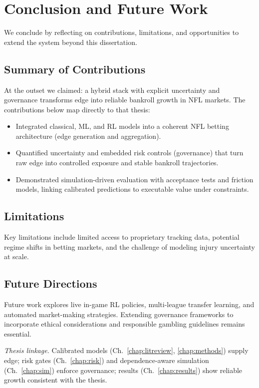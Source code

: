 \chapter{Conclusion and Future Work}
\label{chap:conclusion}

We conclude by reflecting on contributions, limitations, and opportunities to extend the system beyond this dissertation.

\section{Summary of Contributions}
At the outset we claimed: a hybrid stack with explicit uncertainty and governance transforms edge into reliable bankroll growth in NFL markets. The contributions below map directly to that thesis:
\begin{itemize}
  \item Integrated classical, ML, and RL models into a coherent NFL betting architecture (edge generation and aggregation).
  \item Quantified uncertainty and embedded risk controls (governance) that turn raw edge into controlled exposure and stable bankroll trajectories.
  \item Demonstrated simulation-driven evaluation with acceptance tests and friction models, linking calibrated predictions to executable value under constraints.
\end{itemize}

\section{Limitations}
Key limitations include limited access to proprietary tracking data, potential regime shifts in betting markets, and the challenge of modeling injury uncertainty at scale.

\section{Future Directions}
Future work explores live in-game RL policies, multi-league transfer learning, and automated market-making strategies. Extending governance frameworks to incorporate ethical considerations and responsible gambling guidelines remains essential.

\vspace{0.5em}\noindent\textit{Thesis linkage.} Calibrated models (Ch.~\ref{chap:litreview}, \ref{chap:methods}) supply edge; risk gates (Ch.~\ref{chap:risk}) and dependence-aware simulation (Ch.~\ref{chap:sim}) enforce governance; results (Ch.~\ref{chap:results}) show reliable growth consistent with the thesis.

